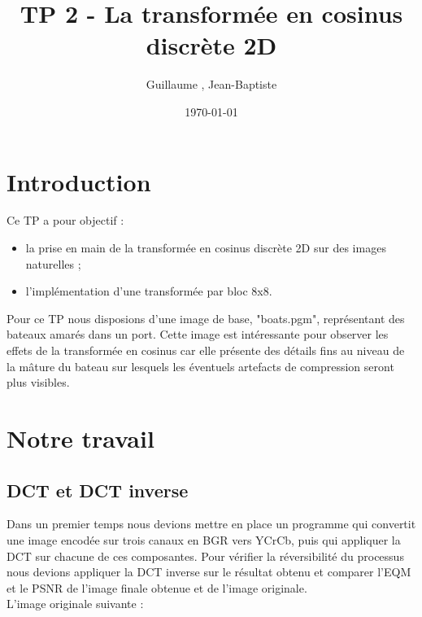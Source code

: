 \documentclass[12pt]{report}
\title{TP 2 - La transformée en cosinus discrète 2D}
\author{Guillaume \bsc{Versal}, Jean-Baptiste \bsc{Morice}}
\date{\today}
\begin{document}
\maketitle

\tableofcontents

\newpage
\section*{Introduction}

Ce TP a pour objectif :
\begin{itemize}
\item la prise en main de la transformée en cosinus discrète 2D sur des images naturelles ;
\item l'implémentation d'une transformée par bloc 8x8.\\
\end{itemize}
Pour ce TP nous disposions d'une image de base, "boats.pgm", représentant des bateaux amarés dans un port. Cette image est intéressante pour observer les effets de la transformée en cosinus car elle présente des détails fins au niveau de la mâture du bateau sur lesquels les éventuels artefacts de compression seront plus visibles.


\newpage
\section{Notre travail}

\subsection{DCT et DCT inverse}
Dans un premier temps nous devions mettre en place un programme qui convertit une image encodée sur trois canaux en BGR vers YCrCb, puis qui appliquer la DCT sur chacune de ces composantes. Pour vérifier la réversibilité du processus nous devions appliquer la DCT inverse sur le résultat obtenu et comparer l'EQM et le PSNR de l'image finale obtenue et de l'image originale.\\

L'image originale suivante :
\end{document}
